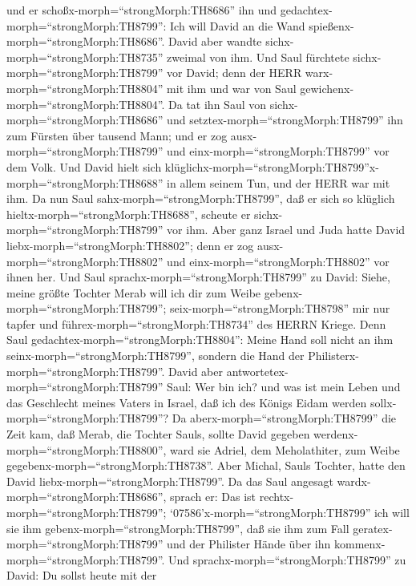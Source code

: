  und er schoßx-morph=``strongMorph:TH8686'' ihn und
gedachtex-morph=``strongMorph:TH8799'': Ich will David an die Wand
spießenx-morph=``strongMorph:TH8686''. David aber wandte
sichx-morph=``strongMorph:TH8735'' zweimal von ihm.  Und
Saul fürchtete sichx-morph=``strongMorph:TH8799'' vor David; denn der
HERR warx-morph=``strongMorph:TH8804'' mit ihm und war von Saul
gewichenx-morph=``strongMorph:TH8804''.  Da tat ihn Saul
von sichx-morph=``strongMorph:TH8686'' und
setztex-morph=``strongMorph:TH8799'' ihn zum Fürsten über tausend Mann;
und er zog ausx-morph=``strongMorph:TH8799'' und
einx-morph=``strongMorph:TH8799'' vor dem Volk.  Und David
hielt sich
klüglichx-morph=``strongMorph:TH8799''x-morph=``strongMorph:TH8688'' in
allem seinem Tun, und der HERR war mit ihm.  Da nun Saul
sahx-morph=``strongMorph:TH8799'', daß er sich so klüglich
hieltx-morph=``strongMorph:TH8688'', scheute er
sichx-morph=``strongMorph:TH8799'' vor ihm.  Aber ganz
Israel und Juda hatte David liebx-morph=``strongMorph:TH8802''; denn er
zog ausx-morph=``strongMorph:TH8802'' und
einx-morph=``strongMorph:TH8802'' vor ihnen her.  Und Saul
sprachx-morph=``strongMorph:TH8799'' zu David: Siehe, meine größte
Tochter Merab will ich dir zum Weibe
gebenx-morph=``strongMorph:TH8799''; seix-morph=``strongMorph:TH8798''
mir nur tapfer und führex-morph=``strongMorph:TH8734'' des HERRN Kriege.
Denn Saul gedachtex-morph=``strongMorph:TH8804'': Meine Hand soll nicht
an ihm seinx-morph=``strongMorph:TH8799'', sondern die Hand der
Philisterx-morph=``strongMorph:TH8799''.  David aber
antwortetex-morph=``strongMorph:TH8799'' Saul: Wer bin ich? und was ist
mein Leben und das Geschlecht meines Vaters in Israel, daß ich des
Königs Eidam werden sollx-morph=``strongMorph:TH8799''?  Da
aberx-morph=``strongMorph:TH8799'' die Zeit kam, daß Merab, die Tochter
Sauls, sollte David gegeben werdenx-morph=``strongMorph:TH8800'', ward
sie Adriel, dem Meholathiter, zum Weibe
gegebenx-morph=``strongMorph:TH8738''.  Aber Michal, Sauls
Tochter, hatte den David liebx-morph=``strongMorph:TH8799''. Da das Saul
angesagt wardx-morph=``strongMorph:TH8686'', sprach er: Das ist
rechtx-morph=``strongMorph:TH8799''; 
`07586'x-morph=``strongMorph:TH8799'' ich will sie ihm
gebenx-morph=``strongMorph:TH8799'', daß sie ihm zum Fall
geratex-morph=``strongMorph:TH8799'' und der Philister Hände über ihn
kommenx-morph=``strongMorph:TH8799''. Und
sprachx-morph=``strongMorph:TH8799'' zu David: Du sollst heute mit der
